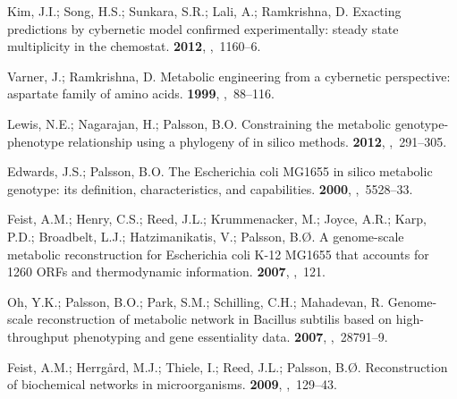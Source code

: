 \documentclass[processes,article,accept,moreauthors,pdftex,12pt,a4paper]{mdpi}
\begin{document}
\begin{thebibliography}{----}
Kim, J.I.; Song, H.S.; Sunkara, S.R.; Lali, A.; Ramkrishna, D.
\newblock Exacting predictions by cybernetic model confirmed experimentally:
  steady state multiplicity in the chemostat.
 {\bf 2012},
,~1160--6.

Varner, J.; Ramkrishna, D.
\newblock Metabolic engineering from a cybernetic perspective: aspartate family
  of amino acids.
 {\bf 1999},
,~88--116.

Lewis, N.E.; Nagarajan, H.; Palsson, B.O.
\newblock Constraining the metabolic genotype-phenotype relationship using a
  phylogeny of in silico methods.
 {\bf 2012},
,~291--305.

Edwards, J.S.; Palsson, B.O.
\newblock The Escherichia coli MG1655 in silico metabolic genotype: its
  definition, characteristics, and capabilities.
 {\bf 2000},
,~5528--33.

Feist, A.M.; Henry, C.S.; Reed, J.L.; Krummenacker, M.; Joyce, A.R.; Karp,
  P.D.; Broadbelt, L.J.; Hatzimanikatis, V.; Palsson, B.{\O}.
\newblock A genome-scale metabolic reconstruction for Escherichia coli K-12
  MG1655 that accounts for 1260 ORFs and thermodynamic information.
 {\bf 2007},
,~121.

Oh, Y.K.; Palsson, B.O.; Park, S.M.; Schilling, C.H.; Mahadevan, R.
\newblock Genome-scale reconstruction of metabolic network in Bacillus subtilis
  based on high-throughput phenotyping and gene essentiality data.
 {\bf 2007},
,~28791--9.

Feist, A.M.; Herrg{\aa}rd, M.J.; Thiele, I.; Reed, J.L.; Palsson, B.{\O}.
\newblock Reconstruction of biochemical networks in microorganisms.
 {\bf 2009},
,~129--43.


\end{thebibliography}
\end{document}
